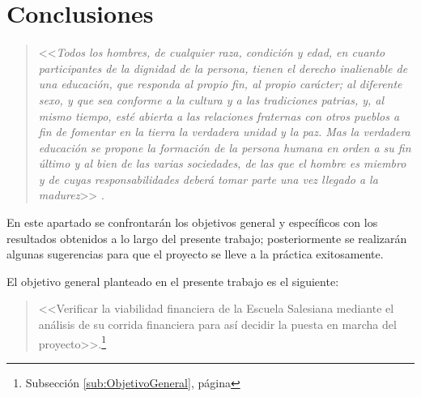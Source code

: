 \chapter*{Conclusiones}
\label{ch:Conclusiones}

\begin{quote}
<<\textit{Todos los hombres, de cualquier raza, condición y edad, en cuanto participantes de la dignidad de la persona, tienen el derecho inalienable de una educación, que responda al propio fin, al propio carácter; al diferente sexo, y que sea conforme a la cultura y a las tradiciones patrias, y, al mismo tiempo, esté abierta a las relaciones fraternas con otros pueblos a fin de fomentar en la tierra la verdadera unidad y la paz. Mas la verdadera educación se propone la formación de la persona humana en orden a su fin último y al bien de las varias sociedades, de las que el hombre es miembro y de cuyas responsabilidades deberá tomar parte una vez llegado a la madurez}>> \citep{GRED1965}.
\end{quote}

En este apartado se confrontarán los objetivos general y específicos con los resultados obtenidos a lo largo del presente trabajo; posteriormente se realizarán algunas sugerencias para que el proyecto se lleve a la práctica exitosamente.





El objetivo general planteado en el presente trabajo es el siguiente:

\begin{quote}
    <<Verificar la viabilidad financiera de la Escuela Salesiana mediante el análisis de su corrida financiera para así decidir la puesta en marcha del proyecto>>.\footnote{Subsección \ref{sub:ObjetivoGeneral}, página \pageref{sub:ObjetivoGeneral}}
\end{quote}


